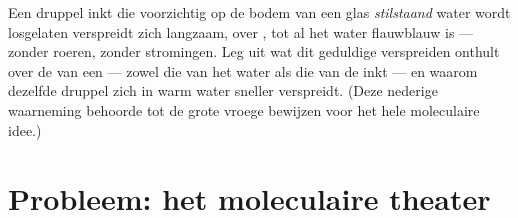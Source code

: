 \begin{exercise}[$\star\star\star$]\label{exo:g7:states-of-matter:12}
Een druppel inkt die voorzichtig op de bodem van een glas
\emph{stilstaand} water wordt losgelaten verspreidt zich langzaam, over
, tot al het water flauwblauw is --- zonder roeren, zonder
stromingen. Leg uit wat dit geduldige verspreiden onthult over de
 van een  --- zowel die van het water als die van
de inkt --- en waarom dezelfde druppel zich in warm water sneller
verspreidt. (Deze nederige waarneming behoorde tot de grote vroege
bewijzen voor het hele moleculaire idee.)
\end{exercise}

\section{Probleem: het moleculaire theater}

